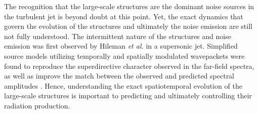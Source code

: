 \documentclass[english]{aiaa-tc}
\begin{document}
The recognition that the large-scale structures are the dominant noise sources in the turbulent jet is beyond doubt at this point. Yet, the exact dynamics that govern the evolution of the structures and ultimately the noise emission are still not fully understood. The intermittent nature of the structures and noise emission was first observed by Hileman \textit{et al.} \cite{hj2005-1} in a supersonic jet. Simplified source models utilizing temporally and spatially modulated wavepackets were found to reproduce the superdirective character observed in the far-field spectra, as well as improve the match between the observed and predicted spectral amplitudes \cite{Sandham2006,Cavalieri2010,Crighton1990}. Hence, understanding the exact spatiotemporal evolution of the large-scale structures is important to predicting and ultimately controlling their radiation production. 
\end{document}
